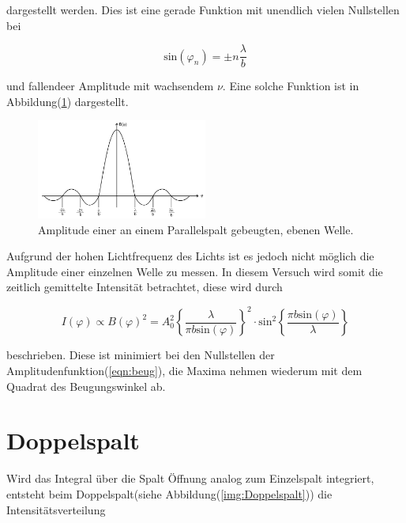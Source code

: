         \noindent dargestellt werden. Dies ist eine gerade Funktion mit unendlich vielen Nullstellen bei 

        \begin{equation*}
            \text{sin}(\varphi_n) = \pm n \frac{\lambda}{b}
        \end{equation*}

        \noindent und fallendeer Amplitude mit wachsendem $\nu$. Eine solche Funktion ist in Abbildung(\ref{img:Amplitude}) dargestellt.

        \begin{figure}[ht]
            \centering
            \includegraphics[width=0.5\textwidth]{latex/images/Amplitude.PNG}
            \caption{Amplitude einer an einem Parallelspalt gebeugten, ebenen Welle\protect \cite{V406}.}
            \label{img:Amplitude}
        \end{figure}

        \noindent Aufgrund der hohen Lichtfrequenz des Lichts ist es jedoch nicht möglich die Amplitude einer einzelnen Welle zu messen. 
        In diesem Versuch wird somit die zeitlich gemittelte Intensität betrachtet, diese wird durch 

        \begin{equation}
            I(\varphi) \propto B(\varphi)^2 = A_0^2 \left\{ \frac{\lambda}{\pi b \text{sin}(\varphi)} \right\}^2 \cdot \text{sin}^2 
            \left\{\frac{\pi b \text{sin}(\varphi)}{\lambda} \right\}
            \label{eqn:einzel}
        \end{equation}

        \noindent beschrieben. Diese ist minimiert bei den Nullstellen der Amplitudenfunktion(\ref{eqn:beug}), die Maxima nehmen wiederum 
        mit dem Quadrat des Beugungswinkel ab.

    \section{Doppelspalt}

        \noindent Wird das Integral über die Spalt Öffnung analog zum Einzelspalt integriert, entsteht beim 
        Doppelspalt(siehe Abbildung(\ref{img:Doppelspalt})) die Intensitätsverteilung

